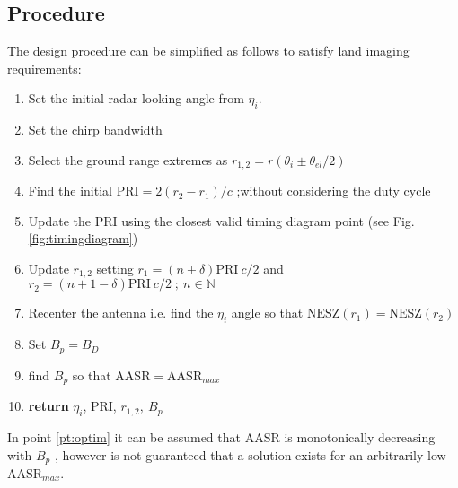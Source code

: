 \documentclass[conference,a4paper]{IEEEtran}
\begin{document}
    \subsection{Procedure}
    \label{subsec:psiproc}
    The design procedure can be simplified as follows to satisfy land imaging requirements:
    \begin{enumerate}
        \item Set the initial radar looking angle from $\eta_i$.
        \item Set the chirp bandwidth
        \item Select the ground range extremes as $r_{1,2} = r(\theta_i \pm \theta_{el}/2)$
        \item Find the initial $\text{PRI} = 2(r_2 - r_1) / c $ ;without considering the duty cycle
        \item Update the PRI using the closest valid timing diagram point (see Fig. \ref{fig:timingdiagram})
        \item Update $r_{1,2}$ setting $r_{1} = (n + \delta)\text{PRI}\ c / 2 $  and\\ $r_2 = (n + 1 - \delta)\text{PRI}\ c / 2\; ;\ n\in \mathbb{N}$
        \item Recenter the antenna i.e. find the $\eta_i$ angle so that $\text{NESZ}(r_1) = \text{NESZ}(r_2)$
        \item Set $B_p = B_D$
        \item find $B_p$ so that AASR$=$AASR$_{max}$ \label{pt:optim}
        \item \textbf{return} $\eta_i$, PRI, $r_{1,2},\  B_p$
    \end{enumerate}
    In point \ref{pt:optim} it can be assumed that AASR is monotonically decreasing with $B_p$ \cite{freeman2018design}, however is not guaranteed that a solution exists for an arbitrarily low AASR$_{max}$.
\end{document}
